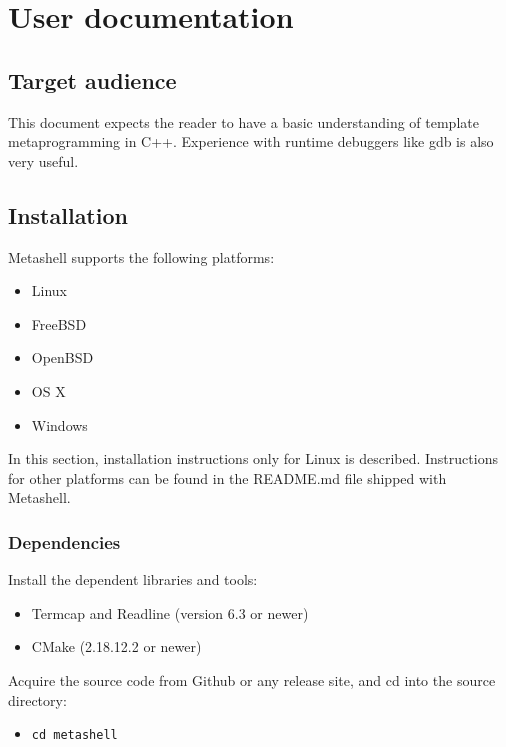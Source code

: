 
\chapter{User documentation} \label{userdoc}

\section{Target audience}

This document expects the reader to have a basic understanding of template
metaprogramming in
C++\cite{using-cpp-metaprograms,generative-programming,functional-programming-cefp}.
Experience with runtime debuggers like gdb\cite{gdb} is also very useful.

\section{Installation}

Metashell supports the following platforms:
\begin{itemize}
    \item Linux
    \item FreeBSD
    \item OpenBSD
    \item OS X
    \item Windows
\end{itemize}

In this section, installation instructions only for Linux is described.
Instructions for other platforms can be found in the README.md file shipped
with Metashell.

\subsection{Dependencies}

Install the dependent libraries and tools:

\begin{itemize}
    \item Termcap and Readline\cite{readline} (version 6.3 or newer)
    \item CMake\cite{cmake} (2.18.12.2 or newer)
\end{itemize}

Acquire the source code from Github\cite{github} or any release site, and cd
into the source directory:

\begin{itemize}
    \item \texttt{cd metashell}
\end{itemize}

